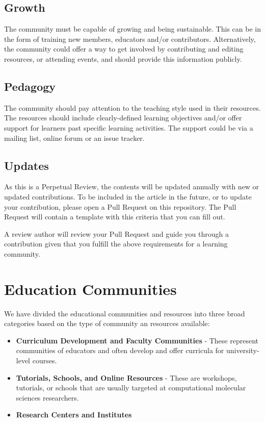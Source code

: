 \documentclass[9pt,review]{livecoms}
\begin{document}
\subsection{Growth} 
The community must be capable of growing and being sustainable. This can be in the form of training new members, educators and/or contributors. Alternatively, the community could offer a way to get involved by contributing and editing resources, or attending events, and should provide this information publicly.
\subsection{Pedagogy}
The community should pay attention to the teaching style used in their resources. The resources should include clearly-defined learning objectives and/or offer support for learners past specific learning activities. The support could be via a mailing list, online forum or an issue tracker.
\subsection{Updates}
As this is a Perpetual Review, the contents will be updated annually with new or updated contributions. To be included in the article in the future, or to update your contribution, please open a Pull Request on this repository. The Pull Request will contain a template with this criteria that you can fill out. 

A review author will review your Pull Request and guide you through a contribution given that you fulfill the above requirements for a learning community. 

\section{Education Communities}

We have divided the educational communities and resources into three broad categories based on the type of community an resources available:
\begin{itemize}
    \item \textbf{Curriculum Development and Faculty Communities} - These represent communities of educators and often develop and offer curricula for university-level courses.
    \item \textbf{Tutorials, Schools, and Online Resources} - These are workshops, tutorials, or schools that are usually targeted at computational molecular sciences researchers. 
    \item \textbf{Research Centers and Institutes}
\end{itemize}
\end{document}
